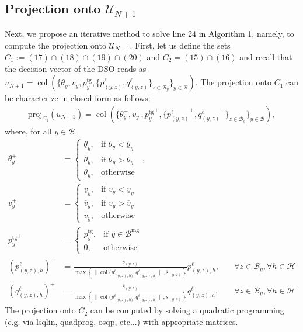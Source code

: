 \documentclass[10pt]{article}
\newtheorem{definitiox	n}{Definition}{\it}{}
\newcommand{\mc}{\mathcal}
\newcommand{\proj}{\mathrm{proj}}
\newcommand{\col}{\operatorname{col}}
\newcommand{\0}{\mathbf{0}}
\newcommand{\1}{\mathbf{1}}
\begin{document}
\subsection{Projection onto $\mc U_{N+1}$}
Next, we propose an iterative method to solve line 24 in Algorithm 1, namely, to compute the projection onto $\mathcal{U}_{N+1}$. First, let us define the sets $C_1 := (17)\cap(18)\cap(19)\cap(20) $ and $C_2 = (15)\cap(16)$ and recall that the decision vector of the DSO reads as $u_{N+1}=\col\left(\{\theta_y, v_y, p_y^{\mathrm{tg}},\{p_{(y,z)}^{\ell},q_{(y,z)}^{\ell}\}_{z \in \mc B_y} \}_{y\in\mc B} \right)$. The projection onto $C_1$ can be characterize in closed-form as follows:
\begin{align*}
\proj_{C_1}(u_{N+1})=
\col\left(\{\theta_y^+, v_y^+, {p_y^{\mathrm{tg}}}^+,\{ {p_{(y,z)}^{\ell}}^+, {q_{(y,z)}^{\ell}}^+ \}_{z \in \mc B_y} \}_{y\in\mc B} \right),
\end{align*}
where, for all $y \in \mc B$,
\begin{align*}
\theta_y^+ &=
\begin{cases}
\underline{\theta}_y, & \text{if } \theta_y < \underline{\theta}_y\\
\overline{\theta}_y, & \text{if } \theta_y > \overline{\theta}_y\\
\theta_y, & \text{otherwise } \
\end{cases}, &  \\
%
v_y^+ &= 
\begin{cases}
\underline{v}_y, & \text{if } v_y < \underline{v}_y\\
\overline{v}_y, & \text{if } v_y > \overline{v}_y\\
v_y, & \text{otherwise } \
\end{cases}
 & \\
%
{p_y^{\text{tg}}}^+ &= 
\begin{cases}
p_y^{\text{tg}}, & \text{if } y \in \mc B^{\text{mg}}\\
0, & \text{otherwise} 
\end{cases}
\\
%
{(p^\ell_{(y,z),h})}^+ & = \frac{\overline{s}_{(y,z)}}{
\max \left\{ \|\col(p^\ell_{(y,z),h)} , q^\ell_{(y,z),h)} \|, \overline{s}_{(y,z)} \right\}
} p^\ell_{(y,z),h},& \quad \forall z \in \mc B_y, \forall h \in \mc H \\
{(q^\ell_{(y,z),h})}^+ & = \frac{\overline{s}_{(y,z)}}{
\max \left\{ \|\col(p^\ell_{(y,z),h)} , q^\ell_{(y,z),h)} \|, \overline{s}_{(y,z)} \right\}
} q^\ell_{(y,z),h} , & \quad \forall z \in \mc B_y, \forall h \in \mc H
\end{align*}
The projection onto $C_2$ can be computed by solving a quadratic programming (e.g. via lsqlin, quadprog, osqp, etc...) with appropriate matrices.
\end{document}
